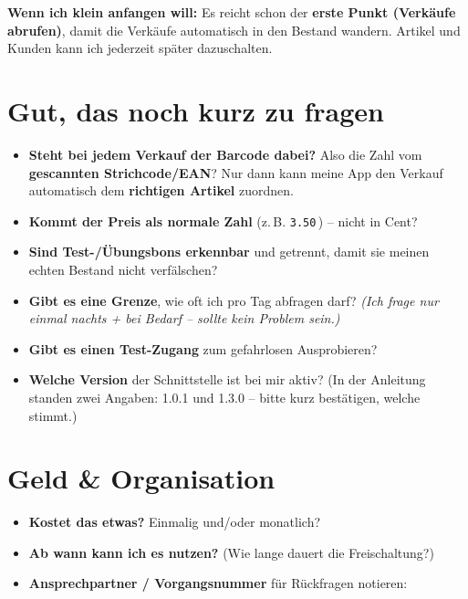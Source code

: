 \documentclass[11pt,a4paper]{article}
\newcommand{\cb}{{\Large$\square$}\ }
\newcommand{\code}[1]{\texttt{\small #1}}
\newcommand{\hinweis}[1]{%
  \par\vspace{4pt}%
  \noindent\colorbox{hellgrau}{%
    \begin{minipage}{\dimexpr\linewidth-2\fboxsep}%
      \small #1%
    \end{minipage}}%
  \par\vspace{6pt}%
}
\newcommand{\techniker}[1]{{\footnotesize\color{dunkelgrau}#1}}
\begin{document}
\hinweis{\textbf{Wenn ich klein anfangen will:} Es reicht schon der \textbf{erste Punkt (Verkäufe abrufen)},
damit die Verkäufe automatisch in den Bestand wandern. Artikel und Kunden kann ich jederzeit später dazuschalten.}

\section{Gut, das noch kurz zu fragen}
\begin{itemize}
  \item[\cb] \textbf{Steht bei jedem Verkauf der Barcode dabei?}
        Also die Zahl vom \textbf{gescannten Strichcode/EAN}? Nur dann kann meine App den Verkauf
        automatisch dem \textbf{richtigen Artikel} zuordnen.
  \item[\cb] \textbf{Kommt der Preis als normale Zahl} (z.\,B. \code{3.50}\,\texteuro) – nicht in Cent?
  \item[\cb] \textbf{Sind Test-/Übungsbons erkennbar} und getrennt, damit sie meinen echten Bestand nicht verfälschen?
  \item[\cb] \textbf{Gibt es eine Grenze}, wie oft ich pro Tag abfragen darf?
        \emph{(Ich frage nur einmal nachts + bei Bedarf – sollte kein Problem sein.)}
  \item[\cb] \textbf{Gibt es einen Test-Zugang} zum gefahrlosen Ausprobieren?
  \item[\cb] \textbf{Welche Version} der Schnittstelle ist bei mir aktiv?
        \techniker{(In der Anleitung standen zwei Angaben: 1.0.1 und 1.3.0 – bitte kurz bestätigen, welche stimmt.)}
\end{itemize}

\section{Geld \& Organisation}
\begin{itemize}
  \item[\cb] \textbf{Kostet das etwas?} Einmalig und/oder monatlich?
  \item[\cb] \textbf{Ab wann kann ich es nutzen?} (Wie lange dauert die Freischaltung?)
  \item[\cb] \textbf{Ansprechpartner / Vorgangsnummer} für Rückfragen notieren: \underline{\hspace{6cm}}
\end{itemize}
\end{document}
